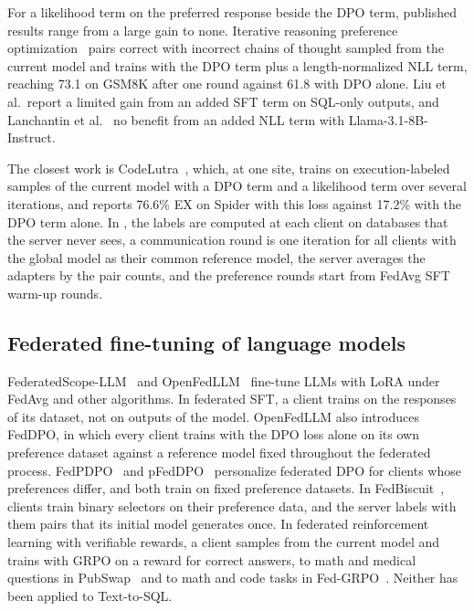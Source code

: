 For a likelihood term on the preferred response beside the DPO term,
published results range from a large gain to none. Iterative reasoning
preference optimization~\cite{pang2024irpo} pairs correct with incorrect
chains of thought sampled from the current model and trains with the DPO
term plus a length-normalized NLL term, reaching 73.1 on GSM8K after one
round against 61.8 with DPO alone. Liu et al.\ report a limited gain from
an added SFT term on SQL-only outputs, and Lanchantin et
al.~\cite{lanchantin2025bridging} no benefit from an added NLL term
with Llama-3.1-8B-Instruct.

The closest work is CodeLutra~\cite{tao2024codelutra}, which, at one
site, trains on execution-labeled samples of the current model with a
DPO term and a likelihood term over several iterations, and reports
76.6\% EX on Spider with this loss against 17.2\% with the DPO term
alone. In \method, the labels are computed at each client on databases
that the server never sees, a communication round is one iteration for
all clients with the global model as their common reference model, the
server averages the adapters by the pair counts, and the preference
rounds start from FedAvg SFT warm-up rounds.

\subsection{Federated fine-tuning of language models}\label{sec:rel-fed}

FederatedScope-LLM~\cite{kuang2024fsllm} and
OpenFedLLM~\cite{ye2024openfedllm} fine-tune LLMs with LoRA under FedAvg
and other algorithms. In
federated SFT, a client trains on the responses of its dataset, not on
outputs of the model. OpenFedLLM also introduces FedDPO, in which every
client trains with the DPO loss alone on its own preference dataset
against a reference model fixed throughout the federated process.
FedPDPO~\cite{zhu2026fedpdpo} and pFedDPO~\cite{jiang2026pfeddpo}
personalize federated DPO for clients whose preferences differ, and both
train on fixed preference datasets. In FedBiscuit~\cite{wu2025fedbiscuit},
clients train binary selectors on their preference data, and the server
labels with them pairs that its initial model generates once. In
federated reinforcement learning with verifiable rewards, a client
samples from the current model and trains with GRPO on a reward for
correct answers, to math and medical questions in
PubSwap~\cite{nayak2026pubswap} and to math and code tasks in
Fed-GRPO~\cite{guo2026fedgrpo}. Neither has been applied to
Text-to-SQL.

